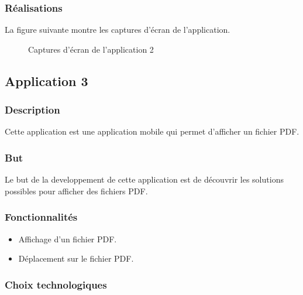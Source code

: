 \subsubsection{Réalisations}
La figure suivante montre les captures d'écran de l'application.

\begin{figure}[H]
    \centering
    \caption{Captures d'écran de l'application 2}
    \label{appendix:capture_app2}
\end{figure}

\subsection{Application 3 }

\subsubsection{Description}
Cette application est une application mobile qui permet d'afficher un fichier PDF.

\subsubsection{But}
Le but de la developpement de cette application est de découvrir les solutions possibles pour afficher des fichiers PDF.

\subsubsection{Fonctionnalités}
\begin{itemize}
    \item Affichage d'un fichier PDF.
    \item Déplacement sur le fichier PDF.
\end{itemize}

\subsubsection{Choix technologiques}

